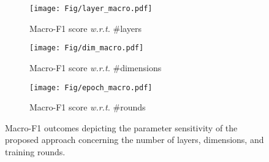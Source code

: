 \begin{figure*}[!h]
    \centering
    \begin{flushleft}
	\begin{subfigure}[t]{0.32\linewidth}
		\texttt{[image: Fig/layer\_macro.pdf]}
		\caption{Macro-F1 score \emph{w.r.t.} \#layers}
		\label{fig:layers2}
	\end{subfigure}
	\begin{subfigure}[t]{0.32\linewidth}
		\texttt{[image: Fig/dim\_macro.pdf]}
		\caption{Macro-F1 score \emph{w.r.t.} \#dimensions}
		\label{fig:dim2}
	\end{subfigure}
	\begin{subfigure}[t]{0.32\linewidth}
		\texttt{[image: Fig/epoch\_macro.pdf]}
		\caption{Macro-F1 score \emph{w.r.t.} \#rounds}
		\label{fig:rounds2}
	\end{subfigure}
	\caption{
        Macro-F1 outcomes depicting the parameter sensitivity of the proposed approach concerning the number of layers, dimensions, and training rounds.
        }
	\label{fig:micro-f2}
    \end{flushleft}
\end{figure*}


